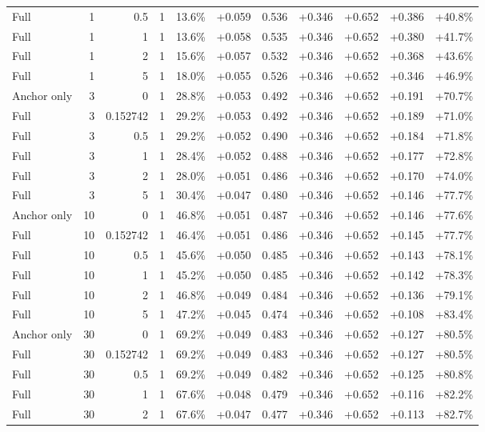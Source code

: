 \begin{table}[htbp]
\begin{tabular}{lrrrccccccc}
Full & 1 & 0.5 & 1 & 13.6\% & +0.059 & 0.536 & +0.346 & +0.652 & +0.386 & +40.8\% \\
Full & 1 & 1 & 1 & 13.6\% & +0.058 & 0.535 & +0.346 & +0.652 & +0.380 & +41.7\% \\
Full & 1 & 2 & 1 & 15.6\% & +0.057 & 0.532 & +0.346 & +0.652 & +0.368 & +43.6\% \\
Full & 1 & 5 & 1 & 18.0\% & +0.055 & 0.526 & +0.346 & +0.652 & +0.346 & +46.9\% \\
Anchor only & 3 & 0 & 1 & 28.8\% & +0.053 & 0.492 & +0.346 & +0.652 & +0.191 & +70.7\% \\
Full & 3 & 0.152742 & 1 & 29.2\% & +0.053 & 0.492 & +0.346 & +0.652 & +0.189 & +71.0\% \\
Full & 3 & 0.5 & 1 & 29.2\% & +0.052 & 0.490 & +0.346 & +0.652 & +0.184 & +71.8\% \\
Full & 3 & 1 & 1 & 28.4\% & +0.052 & 0.488 & +0.346 & +0.652 & +0.177 & +72.8\% \\
Full & 3 & 2 & 1 & 28.0\% & +0.051 & 0.486 & +0.346 & +0.652 & +0.170 & +74.0\% \\
Full & 3 & 5 & 1 & 30.4\% & +0.047 & 0.480 & +0.346 & +0.652 & +0.146 & +77.7\% \\
Anchor only & 10 & 0 & 1 & 46.8\% & +0.051 & 0.487 & +0.346 & +0.652 & +0.146 & +77.6\% \\
Full & 10 & 0.152742 & 1 & 46.4\% & +0.051 & 0.486 & +0.346 & +0.652 & +0.145 & +77.7\% \\
Full & 10 & 0.5 & 1 & 45.6\% & +0.050 & 0.485 & +0.346 & +0.652 & +0.143 & +78.1\% \\
Full & 10 & 1 & 1 & 45.2\% & +0.050 & 0.485 & +0.346 & +0.652 & +0.142 & +78.3\% \\
Full & 10 & 2 & 1 & 46.8\% & +0.049 & 0.484 & +0.346 & +0.652 & +0.136 & +79.1\% \\
Full & 10 & 5 & 1 & 47.2\% & +0.045 & 0.474 & +0.346 & +0.652 & +0.108 & +83.4\% \\
Anchor only & 30 & 0 & 1 & 69.2\% & +0.049 & 0.483 & +0.346 & +0.652 & +0.127 & +80.5\% \\
Full & 30 & 0.152742 & 1 & 69.2\% & +0.049 & 0.483 & +0.346 & +0.652 & +0.127 & +80.5\% \\
Full & 30 & 0.5 & 1 & 69.2\% & +0.049 & 0.482 & +0.346 & +0.652 & +0.125 & +80.8\% \\
Full & 30 & 1 & 1 & 67.6\% & +0.048 & 0.479 & +0.346 & +0.652 & +0.116 & +82.2\% \\
Full & 30 & 2 & 1 & 67.6\% & +0.047 & 0.477 & +0.346 & +0.652 & +0.113 & +82.7\% \\

\end{tabular}
\end{table}

